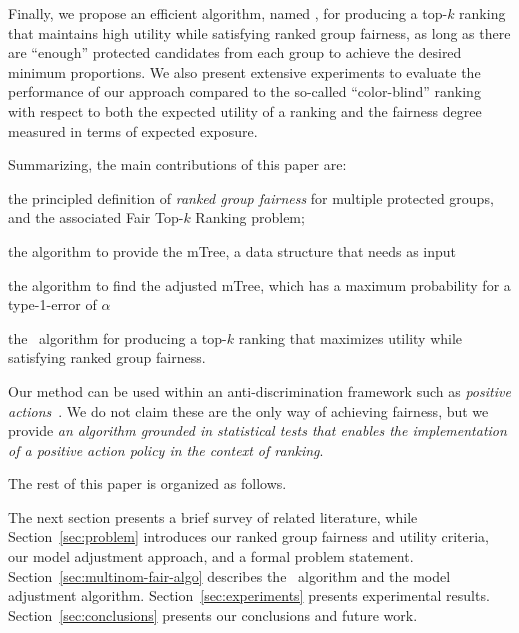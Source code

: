 Finally, we propose an efficient algorithm, named \algoFAIR, for producing a top-$k$ ranking that maintains high utility while satisfying ranked group fairness, as long as there are ``enough'' protected candidates from each group to achieve the desired minimum proportions.
%
We also present extensive experiments to evaluate the performance of our approach compared to the so-called ``color-blind'' ranking with respect to both the expected utility of a ranking and the fairness degree measured in terms of expected exposure.

\medskip

Summarizing, the main contributions of this paper are:
\begin{compactenum}
	\item the principled definition of \emph{ranked group fairness} for multiple protected groups, and the associated  {\sc Fair Top-$k$ Ranking problem};
	\item the \algoComputeMTree algorithm to provide the mTree, a data structure that \algoFAIR needs as input
	\item the \algoCorrect algorithm to find the adjusted mTree, which has a maximum probability for a type-1-error of $\alpha$
	\item the \algoFAIR\ algorithm for producing a top-$k$ ranking that maximizes utility while satisfying ranked group fairness.
\end{compactenum}

Our method can be used within an anti-discrimination framework such as \emph{positive actions}~\cite{sowell2005affirmative}.
%
We do not claim these are the only way of achieving fairness, but we provide \emph{an algorithm grounded in statistical tests that enables the implementation of a positive action policy in the context of ranking}.

The rest of this paper is organized as follows.


The next section presents a brief survey of related literature, while Section~\ref{sec:problem} introduces our ranked group fairness and utility criteria, our model adjustment approach, and a formal problem statement.
%
Section~\ref{sec:multinom-fair-algo} describes the \algoFAIR\ algorithm and the model adjustment algorithm.
%
Section~\ref{sec:experiments} presents experimental results.
%
Section~\ref{sec:conclusions} presents our conclusions and future work.
